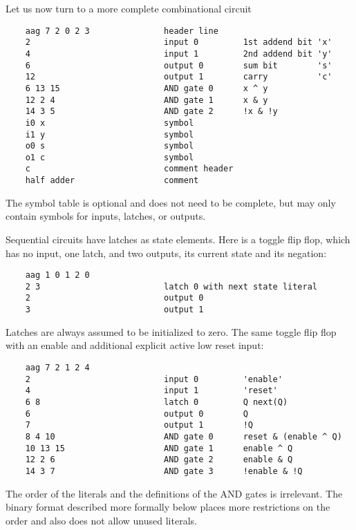 \documentclass[10pt]{llncs}
\begin{document}
  Let us now turn to a more complete combinational circuit

\begin{verbatim}
    aag 7 2 0 2 3               header line
    2                           input 0         1st addend bit 'x'
    4                           input 1         2nd addend bit 'y'
    6                           output 0        sum bit        's'
    12                          output 1        carry          'c'
    6 13 15                     AND gate 0      x ^ y
    12 2 4                      AND gate 1      x & y
    14 3 5                      AND gate 2      !x & !y
    i0 x                        symbol
    i1 y                        symbol
    o0 s                        symbol
    o1 c                        symbol
    c                           comment header
    half adder                  comment
\end{verbatim}

  The symbol table is optional and does not need to be complete, but may
  only contain symbols for inputs, latches, or outputs.

  Sequential circuits have latches as state elements. Here is a toggle flip
  flop, which has no input, one latch, and two outputs, its current state and
  its negation:

\begin{verbatim}
    aag 1 0 1 2 0
    2 3                         latch 0 with next state literal
    2                           output 0
    3                           output 1
\end{verbatim}

  Latches are always assumed to be initialized to zero.  The same toggle
  flip flop with an enable and additional explicit active low reset input:

\begin{verbatim}
    aag 7 2 1 2 4
    2                           input 0         'enable'
    4                           input 1         'reset'
    6 8                         latch 0         Q next(Q)
    6                           output 0        Q
    7                           output 1        !Q
    8 4 10                      AND gate 0      reset & (enable ^ Q)
    10 13 15                    AND gate 1      enable ^ Q
    12 2 6                      AND gate 2      enable & Q
    14 3 7                      AND gate 3      !enable & !Q
\end{verbatim}

  The order of the literals and the definitions of the AND gates
  is irrelevant.  The binary format described more formally below places
  more restrictions on the order and also does not allow unused literals.
\end{document}
